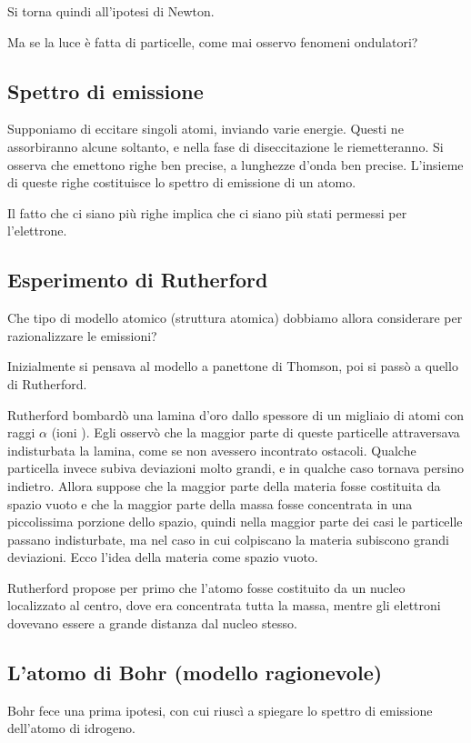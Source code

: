 Si torna quindi all'ipotesi di Newton.

Ma se la luce è fatta di particelle, come mai osservo fenomeni ondulatori?
\subsection{Spettro di emissione}
Supponiamo di eccitare singoli atomi, inviando varie energie. Questi ne assorbiranno alcune soltanto, e nella fase di diseccitazione le riemetteranno. Si osserva che emettono righe ben precise, a lunghezze d'onda ben precise. L'insieme di queste righe costituisce lo spettro di emissione di un atomo.

Il fatto che ci siano più righe implica che ci siano più stati permessi per l'elettrone.
\subsection{Esperimento di Rutherford}
Che tipo di modello atomico (struttura atomica) dobbiamo allora considerare per razionalizzare le emissioni?

Inizialmente si pensava al modello a panettone di Thomson, poi si passò a quello di Rutherford.

Rutherford bombardò una lamina d'oro dallo spessore di un migliaio di atomi con raggi $\alpha$ (ioni ). Egli osservò che la maggior parte di queste particelle attraversava indisturbata la lamina, come se non avessero incontrato ostacoli.
Qualche particella invece subiva deviazioni molto grandi, e in qualche caso tornava persino indietro. Allora suppose che la maggior parte della materia fosse costituita da spazio vuoto e che la maggior parte della massa  fosse concentrata in una piccolissima porzione dello spazio, quindi nella maggior parte dei casi le particelle passano indisturbate, ma nel caso in cui colpiscano la materia subiscono grandi deviazioni. Ecco l'idea della materia come spazio vuoto.

Rutherford propose per primo che l'atomo fosse costituito da un nucleo localizzato al centro, dove era concentrata tutta la massa, mentre gli elettroni dovevano essere a grande distanza dal nucleo stesso.
\subsection{L'atomo di Bohr (modello ragionevole)}
Bohr fece una prima ipotesi, con cui riuscì a spiegare lo spettro di emissione dell'atomo di idrogeno.

